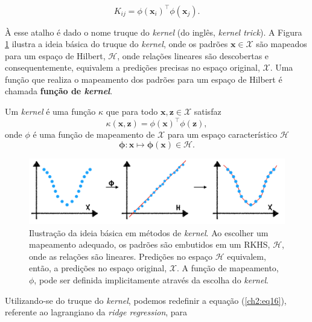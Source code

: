 \begin{equation}
    \label{ch2:26}
    K_{ij} = \phi(\mathbf{x}_i)^{\top} \phi(\mathbf{x}_j).
\end{equation}

À esse atalho é dado o nome truque do \textit{kernel} (do inglês, \textit{kernel trick}). A Figura \ref{fig:kernel-trick} ilustra a ideia básica do truque do \textit{kernel}, onde os padrões $\mathbf{x} \in \mathcal{X}$ são mapeados para um espaço de Hilbert, $\mathcal{H}$, onde relações lineares são descobertas e consequentemente, equivalem a predições precisas no espaço original, $\mathcal{X}$. Uma função que realiza o mapeamento dos padrões para um espaço de Hilbert é chamada \textbf{função de \textit{kernel}}.

\begin{definition}
\label{def:kernel-function}
Um \textit{kernel} é uma função $\kappa$ que para todo $\mathbf{x}, \mathbf{z} \in \mathcal{X}$ satisfaz \[\kappa(\mathbf{x}, \mathbf{z}) = \phi(\mathbf{x})^{\top} \phi(\mathbf{z}), \] onde $\phi$ é uma função de mapeamento de $\mathcal{X}$ para um espaço característico $\mathcal{H}$ \[\mathbf{\phi} : \mathbf{x} \mapsto \mathbf{\phi}(\mathbf{x}) \in \mathcal{H}.\]
\end{definition}

\begin{figure}[H]
    \centering
    \caption{Ilustração da ideia básica em métodos de \textit{kernel}. Ao escolher um mapeamento adequado, os padrões são embutidos em um RKHS, $\mathcal{H}$, onde as relações são lineares. Predições no espaço $\mathcal{H}$ equivalem, então, a predições no espaço original, $\mathcal{X}$. A função de mapeamento, $\phi$, pode ser definida implicitamente através da escolha do \textit{kernel}.}
    \label{fig:kernel-trick}
    \includegraphics[width=\linewidth]{figures/images/kernel-example.png}
\end{figure}

Utilizando-se do truque do \textit{kernel}, podemos redefinir a equação (\ref{ch2:eq16}), referente ao lagrangiano da \textit{ridge regression}, para

